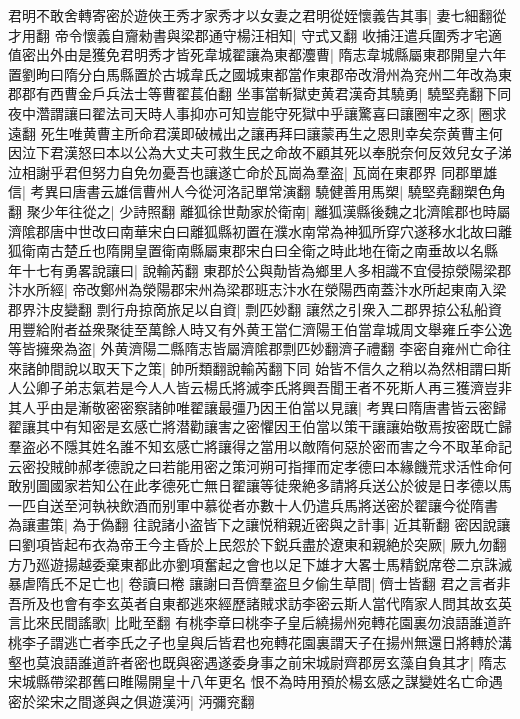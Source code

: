 君明不敢舍轉寄密於遊俠王秀才家秀才以女妻之君明從姪懷義告其事|{
	妻七細翻從才用翻}
帝令懷義自齎勑書與梁郡通守楊汪相知|{
	守式又翻}
收捕汪遣兵圍秀才宅適值密出外由是獲免君明秀才皆死韋城翟讓為東都灋曹|{
	隋志韋城縣屬東郡開皇六年置劉昫曰隋分白馬縣置於古城韋氏之國城東都當作東郡帝改滑州為兖州二年改為東郡郡有西曹金戶兵法士等曹翟萇伯翻}
坐事當斬獄吏黄君漢奇其驍勇|{
	驍堅堯翻下同}
夜中濳謂讓曰翟法司天時人事抑亦可知豈能守死獄中乎讓驚喜曰讓圈牢之豕|{
	圈求遠翻}
死生唯黄曹主所命君漢即破械出之讓再拜曰讓蒙再生之恩則幸矣奈黄曹主何因泣下君漢怒曰本以公為大丈夫可救生民之命故不顧其死以奉脱奈何反效兒女子涕泣相謝乎君但努力自免勿憂吾也讓遂亡命於瓦崗為羣盗|{
	瓦崗在東郡界}
同郡單雄信|{
	考異曰唐書云雄信曹州人今從河洛記單常演翻}
驍健善用馬槊|{
	驍堅堯翻槊色角翻}
聚少年往從之|{
	少詩照翻}
離狐徐世勣家於衛南|{
	離狐漢縣後魏之北濟隂郡也時屬濟隂郡唐中世改曰南華宋白曰離狐縣初置在濮水南常為神狐所穿穴遂移水北故曰離狐衛南古楚丘也隋開皇置衛南縣屬東郡宋白曰全衛之時此地在衛之南垂故以名縣}
年十七有勇畧說讓曰|{
	說輸芮翻}
東郡於公與勣皆為鄉里人多相識不宜侵掠滎陽梁郡汴水所經|{
	帝改鄭州為滎陽郡宋州為梁郡班志汴水在滎陽西南蓋汴水所起東南入梁郡界汴皮變翻}
剽行舟掠啇旅足以自資|{
	剽匹妙翻}
讓然之引衆入二郡界掠公私船資用豐給附者益衆聚徒至萬餘人時又有外黄王當仁濟陽王伯當韋城周文舉雍丘李公逸等皆擁衆為盗|{
	外黄濟陽二縣隋志皆屬濟隂郡剽匹妙翻濟子禮翻}
李密自雍州亡命往來諸帥間說以取天下之策|{
	帥所類翻說輸芮翻下同}
始皆不信久之稍以為然相謂曰斯人公卿子弟志氣若是今人人皆云楊氏將滅李氏將興吾聞王者不死斯人再三獲濟豈非其人乎由是漸敬密密察諸帥唯翟讓最彊乃因王伯當以見讓|{
	考異曰隋唐書皆云密歸翟讓其中有知密是玄感亡將潜勸讓害之密懼因王伯當以策干讓讓始敬焉按密既亡歸羣盗必不隱其姓名誰不知玄感亡將讓得之當用以敵隋何惡於密而害之今不取革命記云密投賊帥郝孝德說之曰若能用密之策河朔可指揮而定孝德曰本緣饑荒求活性命何敢别圖國家若知公在此孝德死亡無日翟讓等徒衆絶多請將兵送公於彼是日孝德以馬一匹自送至河執袂飲酒而别軍中慕從者亦數十人仍遣兵馬將送密於翟讓今從隋書}
為讓畫策|{
	為于偽翻}
往說諸小盗皆下之讓悦稍親近密與之計事|{
	近其靳翻}
密因說讓曰劉項皆起布衣為帝王今主昏於上民怨於下鋭兵盡於遼東和親絶於突厥|{
	厥九勿翻}
方乃廵遊揚越委棄東都此亦劉項奮起之會也以足下雄才大畧士馬精鋭席卷二京誅滅暴虐隋氏不足亡也|{
	卷讀曰棬}
讓謝曰吾儕羣盗旦夕偷生草間|{
	儕士皆翻}
君之言者非吾所及也會有李玄英者自東都逃來經歷諸賊求訪李密云斯人當代隋家人問其故玄英言比來民間謠歌|{
	比毗至翻}
有桃李章曰桃李子皇后繞揚州宛轉花園裏勿浪語誰道許桃李子謂逃亡者李氏之子也皇與后皆君也宛轉花園裏謂天子在揚州無還日將轉於溝壑也莫浪語誰道許者密也既與密遇遂委身事之前宋城尉齊郡房玄藻自負其才|{
	隋志宋城縣帶梁郡舊曰睢陽開皇十八年更名}
恨不為時用預於楊玄感之謀變姓名亡命遇密於梁宋之間遂與之俱遊漢沔|{
	沔彌兖翻}
